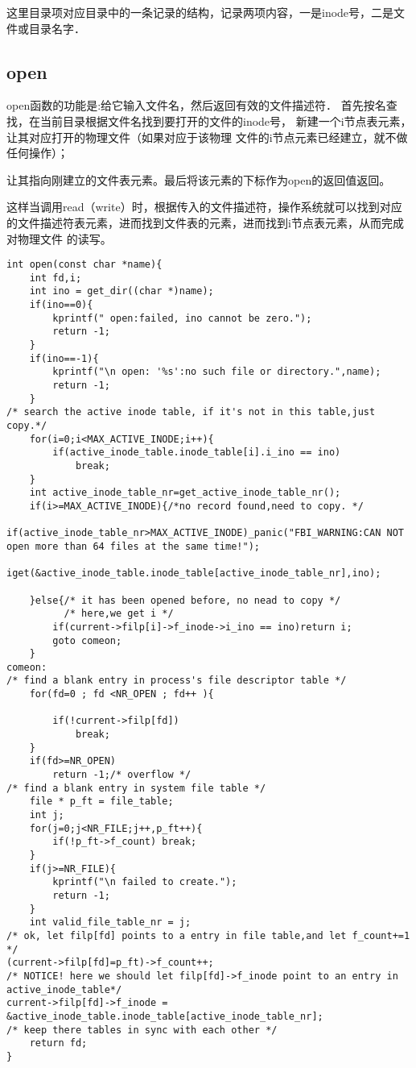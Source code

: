 这里目录项对应目录中的一条记录的结构，记录两项内容，一是inode号，二是文件或目录名字．

\subsection{open}
open函数的功能是:给它输入文件名，然后返回有效的文件描述符．
首先按名查找，在当前目录根据文件名找到要打开的文件的inode号，
新建一个i节点表元素，让其对应打开的物理文件（如果对应于该物理
文件的i节点元素已经建立，就不做任何操作）；

让其指向刚建立的文件表元素。最后将该元素的下标作为open的返回值返回。

这样当调用read（write）时，根据传入的文件描述符，操作系统就可以找到对应
的文件描述符表元素，进而找到文件表的元素，进而找到i节点表元素，从而完成对物理文件
的读写。




\begin{verbatim}   
int open(const char *name){
	int fd,i;
	int ino = get_dir((char *)name);
	if(ino==0){
		kprintf(" open:failed, ino cannot be zero.");
		return -1;
	}
	if(ino==-1){
		kprintf("\n open: '%s':no such file or directory.",name);
		return -1;
	}
/* search the active inode table, if it's not in this table,just copy.*/	
	for(i=0;i<MAX_ACTIVE_INODE;i++){
		if(active_inode_table.inode_table[i].i_ino == ino)
			break;
	}
	int active_inode_table_nr=get_active_inode_table_nr();
	if(i>=MAX_ACTIVE_INODE){/*no record found,need to copy. */
		if(active_inode_table_nr>MAX_ACTIVE_INODE)_panic("FBI_WARNING:CAN NOT open more than 64 files at the same time!");
		iget(&active_inode_table.inode_table[active_inode_table_nr],ino);

	}else{/* it has been opened before, no nead to copy */
	      /* here,we get i */
		if(current->filp[i]->f_inode->i_ino == ino)return i;
		goto comeon;
	}
comeon:	
/* find a blank entry in process's file descriptor table */	
	for(fd=0 ; fd <NR_OPEN ; fd++ ){

		if(!current->filp[fd])
			break;
	}
	if(fd>=NR_OPEN)
		return -1;/* overflow */
/* find a blank entry in system file table */	
	file * p_ft = file_table;
	int j;
	for(j=0;j<NR_FILE;j++,p_ft++){
		if(!p_ft->f_count) break;
	}
	if(j>=NR_FILE){
		kprintf("\n failed to create.");
		return -1;
	}
	int valid_file_table_nr = j;
/* ok, let filp[fd] points to a entry in file table,and let f_count+=1 */
(current->filp[fd]=p_ft)->f_count++;
/* NOTICE! here we should let filp[fd]->f_inode point to an entry in active_inode_table*/
current->filp[fd]->f_inode = &active_inode_table.inode_table[active_inode_table_nr];
/* keep there tables in sync with each other */
	return fd;
}
\end{verbatim}

